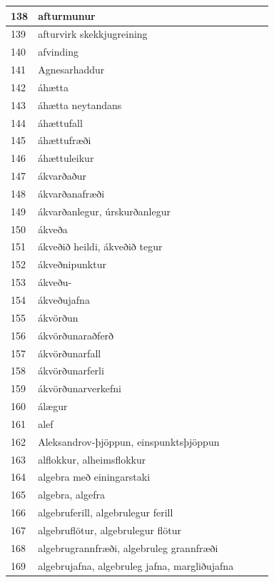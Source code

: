 \begin{longtable}{p{}|p{}|p{}|p{}|p{}}
\hline
138 & afturmunur &  &  &  \\
\hline
139 & afturvirk skekkjugreining &  &  &  \\
\hline
140 & afvinding &  &  &  \\
\hline
141 & Agnesarhaddur &  &  &  \\
\hline
142 & áhætta &  &  &  \\
\hline
143 & áhætta neytandans &  &  &  \\
\hline
144 & áhættufall &  &  &  \\
\hline
145 & áhættufræði &  &  &  \\
\hline
146 & áhættuleikur &  &  &  \\
\hline
147 & ákvarðaður &  &  &  \\
\hline
148 & ákvarðanafræði &  &  &  \\
\hline
149 & ákvarðanlegur, úrskurðanlegur &  &  &  \\
\hline
150 & ákveða &  &  &  \\
\hline
151 & ákveðið heildi, ákveðið tegur &  &  &  \\
\hline
152 & ákveðnipunktur &  &  &  \\
\hline
153 & ákveðu- &  &  &  \\
\hline
154 & ákveðujafna &  &  &  \\
\hline
155 & ákvörðun &  &  &  \\
\hline
156 & ákvörðunaraðferð &  &  &  \\
\hline
157 & ákvörðunarfall &  &  &  \\
\hline
158 & ákvörðunarferli &  &  &  \\
\hline
159 & ákvörðunarverkefni &  &  &  \\
\hline
160 & álægur &  &  &  \\
\hline
161 & alef &  &  &  \\
\hline
162 & Aleksandrov-þjöppun, einspunktsþjöppun &  &  &  \\
\hline
163 & alflokkur, alheimsflokkur &  &  &  \\
\hline
164 & algebra með einingarstaki &  &  &  \\
\hline
165 & algebra, algefra &  &  &  \\
\hline
166 & algebruferill, algebrulegur ferill &  &  &  \\
\hline
167 & algebruflötur, algebrulegur flötur &  &  &  \\
\hline
168 & algebrugrannfræði, algebruleg grannfræði &  &  &  \\
\hline
169 & algebrujafna, algebruleg jafna, margliðujafna &  &  &  \\

\end{longtable}

